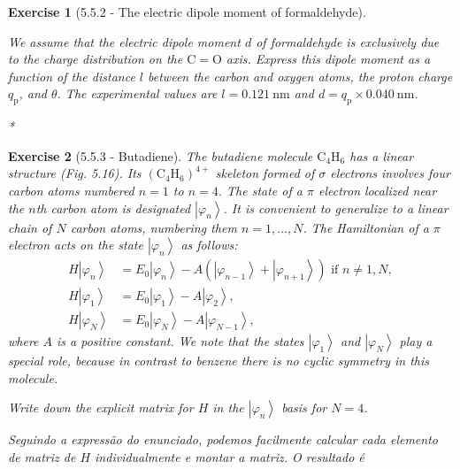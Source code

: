 \documentclass[12pt]{article}
\def\eeaa{\end{eqnarray}}
\def\f{\frac}
\newtheorem{exercise}{Exercise}
\begin{document}
\begin{exercise}[5.5.2 - The electric dipole moment of formaldehyde]
\begin{exercises}
			\item We assume that the electric dipole moment $d$ of formaldehyde is exclusively due to the charge distribution on the $\mathrm{C}=\mathrm{O}$ axis. Express this dipole moment as a function of the distance $l$ between the carbon and oxygen atoms, the proton charge $q_{\mathrm{p}}$, and $\theta$. The experimental values are $l=0.121 \mathrm{~nm}$ and $d=q_{\mathrm{p}} \times 0.040 \mathrm{~nm}$.
			\begin{multianswer}[true]
				*		
			\end{multianswer}
		\end{exercises}		
	\end{exercise}

	\begin{exercise}[5.5.3 - Butadiene]
		The butadiene molecule $\mathrm{C}_{4} \mathrm{H}_{6}$ has a linear structure (Fig. 5.16). Its $\left(\mathrm{C}_{4} \mathrm{H}_{6}\right)^{4+}$ skeleton formed of $\sigma$ electrons involves four carbon atoms numbered $n=1$ to $n=4$. The state 	of a $\pi$ electron localized near the $n$th carbon atom is designated $\left|\varphi_{n}\right\rangle$. It is convenient to generalize to a linear chain of $N$ carbon atoms, numbering them $n=1, \ldots, N$. The Hamiltonian of a $\pi$ electron acts on the state $\left|\varphi_{n}\right\rangle$ as follows:
		$$
		\begin{aligned}
			H\left|\varphi_{n}\right\rangle & =E_{0}\left|\varphi_{n}\right\rangle-A\left(\left|\varphi_{n-1}\right\rangle+\left|\varphi_{n+1}\right\rangle\right) \text { if } n \neq 1, N, \\
			H\left|\varphi_{1}\right\rangle & =E_{0}\left|\varphi_{1}\right\rangle-A\left|\varphi_{2}\right\rangle, \\
			H\left|\varphi_{N}\right\rangle & =E_{0}\left|\varphi_{N}\right\rangle-A\left|\varphi_{N-1}\right\rangle,
		\end{aligned}
		$$
		where $A$ is a positive constant. We note that the states $\left|\varphi_{1}\right\rangle$ and $\left|\varphi_{N}\right\rangle$ play a special role, because in contrast to benzene there is no cyclic symmetry in this molecule.
		\begin{exercises}
			\item Write down the explicit matrix for $H$ in the $\left|\varphi_{n}\right\rangle$ basis for $N=4$.
			\begin{multianswer}
				Seguindo a expressão do enunciado, podemos facilmente calcular cada elemento de matriz de $H$ individualmente e montar a matriz. O resultado é

\end{multianswer}
\end{exercises}
\end{exercise}
\end{document}
